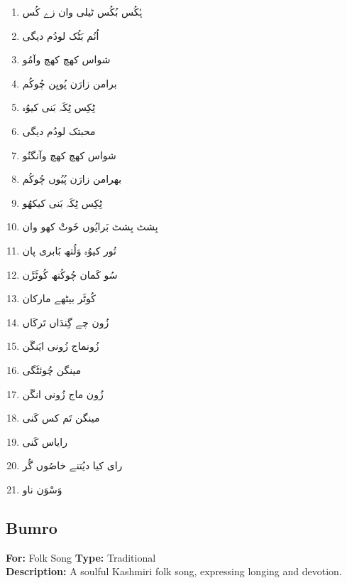 \documentclass[12pt]{article}
\newcommand{\bigarabic}[1]{\fontsize{16pt}{18pt}\selectfont \textarabic{#1}}
\begin{document}
\begin{multicols}{2}
\begin{RTL}
\begin{enumerate}[leftmargin=*, label=\arabic*., font=\fontsize{16pt}{18pt}\selectfont]
  \item \bigarabic{ہُکُس بُکُس ٹیلی وان زے کُس}
  \item \bigarabic{اُنُم بَٹُک لودُم دیگی}
  \item \bigarabic{شواس کھچ کھچ وآمُو}
  \item \bigarabic{برامن زارَن پُویِن چُوکُم}
  \item \bigarabic{ٹِکِس ٹِکَہ بَنی کیوُہ}
  \item \bigarabic{محبتک لودُم دیگی}
  \item \bigarabic{شواس کھچ کھچ وآنگنُو}
  \item \bigarabic{بھرامن زارَن پُیُوں چُوکُم}
  \item \bigarabic{ٹِکِس ٹِکَہ بَنی کیکھُو}
  \item \bigarabic{بِشٹ بِشٹ بَرایُوں خَوتْ کھو وان}
  \item \bigarabic{تُور کیوُہ وَلُتھ بَابری پان}
  \item \bigarabic{سُو کَمان چُوکُتھ کُوٹَڑَن}
  \item \bigarabic{کُوٹَر بیٹھے مارکان}
  \item \bigarabic{زُون چے گِندَاں تَرکَاں}
  \item \bigarabic{زُونماج زُونی ایَنگَن}
  \item \bigarabic{مینگن چُوئٹَگی}
  \item \bigarabic{زُون ماج زُونی انگَن}
  \item \bigarabic{مینگن تَم کس کَنی}
  \item \bigarabic{رایاس کَنی}
  \item \bigarabic{رای کیا دیُتنے خاصُوں گُر}
  \item \bigarabic{وَسْوَن ناو}
\end{enumerate}
\end{RTL}
\end{multicols}

\subsection*{Bumro}
\textbf{For:} Folk Song \quad \textbf{Type:} Traditional\\
\textbf{Description:} A soulful Kashmiri folk song, expressing longing and devotion.
\end{document}
